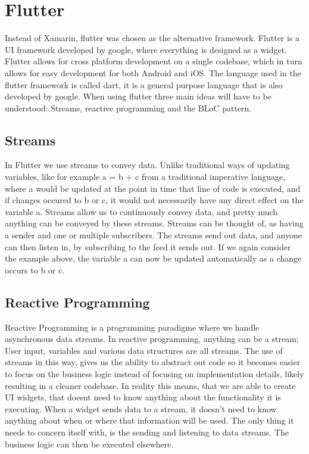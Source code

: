 \section{Flutter}
Instead of Xamarin, flutter was chosen as the alternative framework.
Flutter is a UI framework developed by google, where everything is designed as a widget.
Flutter allows for cross platform development on a single codebase, which in turn allows for easy development for both Android and iOS.
The language used in the flutter framework is called dart, it is a general purpose language that is also developed by google.
When using flutter three main ideas will have to be understood:
Streams, reactive programming and the BLoC pattern.

\subsection{Streams}
In Flutter we use streams to convey data.
Unlike traditional ways of updating variables, like for example a = b + c from a traditional imperative language, where a would be updated at the point in time that line of code is executed, and if changes occured to b or c, it would not necessarily have any direct effect on the variable a.
Streams allow us to continuously convey data, and pretty much anything can be conveyed by these streams.
Streams can be thought of, as having a sender and one or multiple subscribers.
The streams send out data, and anyone can then listen in, by subscribing to the feed it sends out.
If we again consider the example above, the variable a can now be updated automatically as a change occurs to b or c.
\subsection{Reactive Programming}
Reactive Programming is a programming paradigme where we handle asynchronous data streams. 
In reactive programming, anything can be a stream; User input, variables and various data structures are all streams. The use of streams in this way, gives us the ability to abstract out code so it becomes easier to focus on the business logic instead of focusing on implementation details, likely resulting in a cleaner codebase.
In reality this means, that we are able to create UI widgets, that doesnt need to know anything about the functionality it is executing. 
When a widget sends data to a stream, it doesn't need to know anything about when or where that information will be used. The only thing it needs to concern itself with, is the sending and listening to data streams. The business logic can then be executed elsewhere. 

